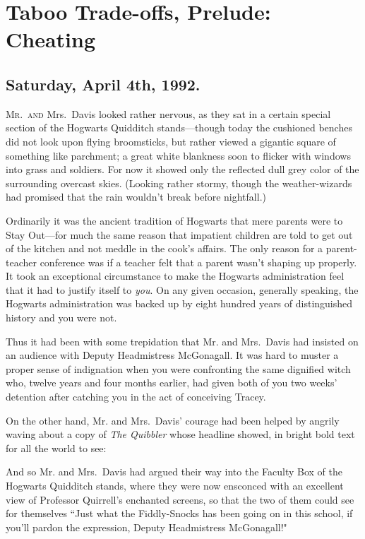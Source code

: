 \chapter{Taboo Trade-offs, Prelude: Cheating}

\section{Saturday, April 4th, 1992.}

\lettrine{M}{r.~and} Mrs.~Davis looked rather nervous, as they sat in a certain special section of the Hogwarts Quidditch stands—though today the cushioned benches did not look upon flying broomsticks, but rather viewed a gigantic square of something like parchment; a great white blankness soon to flicker with windows into grass and soldiers. For now it showed only the reflected dull grey color of the surrounding overcast skies. (Looking rather stormy, though the weather-wizards had promised that the rain wouldn't break before nightfall.)

Ordinarily it was the ancient tradition of Hogwarts that mere parents were to Stay Out—for much the same reason that impatient children are told to get out of the kitchen and not meddle in the cook's affairs. The only reason for a parent-teacher conference was if a teacher felt that a parent wasn't shaping up properly. It took an exceptional circumstance to make the Hogwarts administration feel that it had to justify itself to \emph{you}. On any given occasion, generally speaking, the Hogwarts administration was backed up by eight hundred years of distinguished history and you were not.

Thus it had been with some trepidation that Mr. and Mrs.~Davis had insisted on an audience with Deputy Headmistress McGonagall. It was hard to muster a proper sense of indignation when you were confronting the same dignified witch who, twelve years and four months earlier, had given both of you two weeks' detention after catching you in the act of conceiving Tracey.

On the other hand, Mr. and Mrs.~Davis' courage had been helped by angrily waving about a copy of \emph{The Quibbler} whose headline showed, in bright bold text for all the world to see:


And so Mr. and Mrs.~Davis had argued their way into the Faculty Box of the Hogwarts Quidditch stands, where they were now ensconced with an excellent view of Professor Quirrell's enchanted screens, so that the two of them could see for themselves ``Just what the Fiddly-Snocks has been going on in this school, if you'll pardon the expression, Deputy Headmistress McGonagall!"

